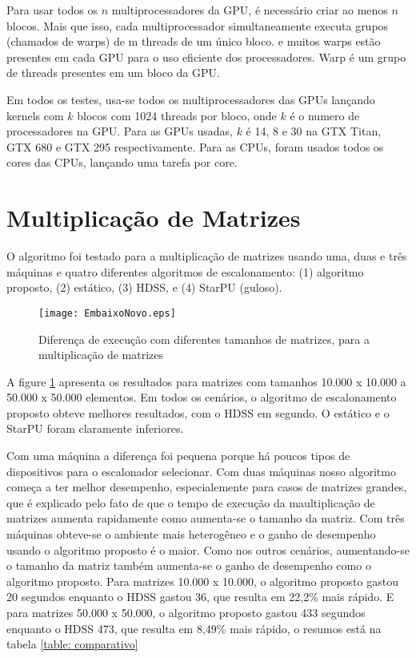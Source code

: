 Para usar todos os $n$ multiprocessadores da GPU, é necessário criar ao menos $n$ blocos. Mais que isso, cada multiprocessador simultaneamente executa grupos (chamados de warps) de m threads de um único bloco. e muitos warps estão presentes em cada GPU para o uso eficiente dos processadores. Warp é um grupo de threads presentes em um bloco da GPU.

Em todos os testes, usa-se todos os multiprocessadores das GPUs lançando kernels com $k$ blocos com 1024 threads por bloco, onde $k$ é o numero de processadores na GPU. Para as GPUs usadas, $k$ é 14, 8 e 30 na GTX Titan, GTX 680 e GTX 295 respectivamente. Para as CPUs, foram usados todos os cores das CPUs, lançando uma tarefa por core.

\section{Multiplicação de Matrizes}


O algoritmo foi testado para a multiplicação de matrizes usando uma, duas e três máquinas e quatro diferentes algoritmos de escalonamento: (1) algoritmo proposto, (2) estático, (3) HDSS, e (4) StarPU (guloso).

\begin{figure}[htb]
	\begin{center}
	\centering
			\texttt{[image: EmbaixoNovo.eps]}
	\caption{Diferença de execução com diferentes tamanhos de matrizes, para a multiplicação de matrizes}
	\label{fig:todosJuntos}
	\end{center}
\end{figure}

A figure \ref{fig:todosJuntos} apresenta os resultados para matrizes com tamanhos 10.000 x 10.000 a 50.000 x 50.000 elementos. Em todos os cenários, o algoritmo de escalonamento proposto obteve melhores resultados, com o HDSS em segundo. O estático e o StarPU foram claramente inferiores.

Com uma máquina a diferença foi pequena porque há poucos tipos de dispositivos para o escalonador selecionar. Com duas máquinas nosso algoritmo começa a ter melhor desempenho, especialemente para casos de matrizes grandes, que é explicado pelo fato de que o tempo de execução da maultiplicação de matrizes aumenta rapidamente como aumenta-se o tamanho da matriz. Com três máquinas obteve-se o ambiente mais heterogêneo e o ganho de desempenho usando o algoritmo proposto é o maior. Como nos outros cenários, aumentando-se o tamanho da matriz também aumenta-se o ganho de desempenho como o algoritmo proposto. Para matrizes 10.000 x 10.000, o algoritmo proposto gastou 20 segundos enquanto o HDSS gastou 36, que resulta em 22,2\% mais rápido. E para matrizes 50.000 x 50.000, o algoritmo proposto gastou 433 segundos enquanto o HDSS 473, que resulta em 8,49\% mais rápido, o resumos está na tabela \ref{table: comparativo}

